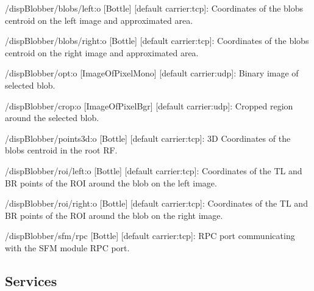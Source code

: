 \begin{DoxyItemize}
\item /disp\+Blobber/blobs/left\+:o \mbox{[}Bottle\mbox{]} \mbox{[}default carrier\+:tcp\mbox{]}\+: Coordinates of the blob\textquotesingle{}s centroid on the left image and approximated area.
\item /disp\+Blobber/blobs/right\+:o \mbox{[}Bottle\mbox{]} \mbox{[}default carrier\+:tcp\mbox{]}\+: Coordinates of the blob\textquotesingle{}s centroid on the right image and approximated area.
\item /disp\+Blobber/opt\+:o \mbox{[}Image\+Of\+Pixel\+Mono\mbox{]} \mbox{[}default carrier\+:udp\mbox{]}\+: Binary image of selected blob.
\item /disp\+Blobber/crop\+:o \mbox{[}Image\+Of\+Pixel\+Bgr\mbox{]} \mbox{[}default carrier\+:udp\mbox{]}\+: Cropped region around the selected blob.
\item /disp\+Blobber/points3d\+:o \mbox{[}Bottle\mbox{]} \mbox{[}default carrier\+:tcp\mbox{]}\+: 3D Coordinates of the blob\textquotesingle{}s centroid in the root RF.
\item /disp\+Blobber/roi/left\+:o \mbox{[}Bottle\mbox{]} \mbox{[}default carrier\+:tcp\mbox{]}\+: Coordinates of the TL and BR points of the R\+OI around the blob on the left image.
\item /disp\+Blobber/roi/right\+:o \mbox{[}Bottle\mbox{]} \mbox{[}default carrier\+:tcp\mbox{]}\+: Coordinates of the TL and BR points of the R\+OI around the blob on the right image.
\item /disp\+Blobber/sfm/rpc \mbox{[}Bottle\mbox{]} \mbox{[}default carrier\+:tcp\mbox{]}\+: R\+PC port communicating with the S\+FM module R\+PC port.
\end{DoxyItemize}\hypertarget{group__lbpExtract_services_sec}{}\subsection{Services}\label{group__lbpExtract_services_sec}
